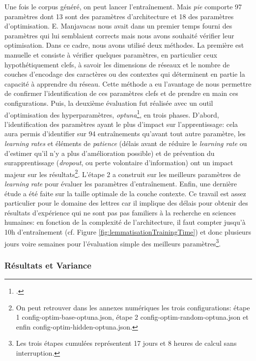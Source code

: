 Une fois le corpus généré, on peut lancer l'entraînement. Mais \textit{pie} comporte 97 paramètres dont 13 sont des paramètres d'architecture et 18 des paramètres d'optimisation. E. Manjavacas nous avait dans un premier temps fourni des paramètres qui lui semblaient corrects mais nous avons souhaité vérifier leur optimisation. Dans ce cadre, nous avons utilisé deux méthodes. La première est manuelle et consiste à vérifier quelques paramètres, en particulier ceux hypothétiquement clefs, à savoir les dimensions de réseaux et le nombre de couches d'encodage des caractères ou des contextes qui déterminent en partie la capacité à apprendre du réseau. Cette méthode a eu l'avantage de nous permettre de confirmer l'identification de ces paramètres clefs et de prendre en main ces configurations. Puis, la deuxième évaluation fut réalisée avec un outil d'optimisation des hyperparamètres, \textit{optuna}\footcite{optuna_2019}, en trois phases. D'abord, l'identification des paramètres ayant le plus d'impact sur l'apprentissage: cela aura permis d'identifier sur 94 entraînements qu'avant tout autre paramètre, les \textit{learning rates} et éléments de \textit{patience} (délais avant de réduire le \textit{learning rate} ou d'estimer qu'il n'y a plus d'amélioration possible) et de prévention du surapprentissage (\textit{dropout}, ou perte volontaire d'information) ont un impact majeur sur les résultats\footnote{On peut retrouver dans les annexes numériques les trois configurations: étape 1 config-optim-base-optuna.json, étape 2 config-optim-random-optuna.json et enfin config-optim-hidden-optuna.json.}. L'étape 2 a construit sur les meilleurs paramètres de \textit{learning rate} pour évaluer les paramètres d'entraînement. Enfin, une dernière étude a été faite sur la taille optimale de la couche contexte. Ce travail est assez particulier pour le domaine des lettres car il implique des délais pour obtenir des résultats d'expérience qui ne sont pas pas familiers à la recherche en sciences humaines: en fonction de la complexité de l'architecture, il faut compter jusqu'à 10h d'entraînement (cf. Figure \ref{fig:lemmatisationTrainingTime}) et donc plusieurs jours voire semaines pour l'évaluation simple des meilleurs paramètres\footnote{Les trois étapes cumulées représentent 17 jours et 8 heures de calcul sans interruption.}.


\subsubsection{Résultats et Variance}

